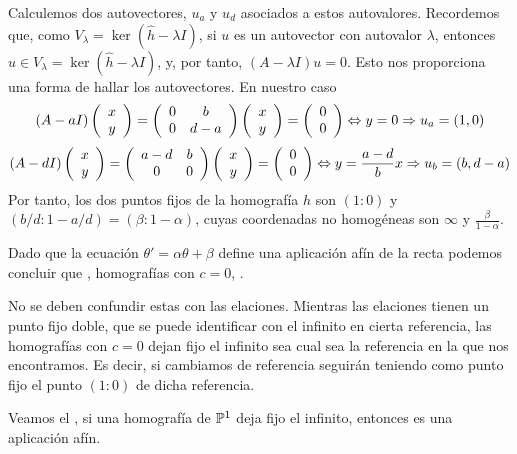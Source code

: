 Calculemos dos autovectores, $u_a$ y $u_d$ asociados a estos autovalores. Recordemos que, como $V_{\lambda}= \ker(\widehat{h}-\lambda I)$, si $u$ es un autovector con autovalor $\lambda$, entonces $u\in V_{\lambda}= \ker(\widehat{h}-\lambda I)$, y, por tanto, $(A-\lambda I)u=0$. Esto nos proporciona una forma de hallar los autovectores. En nuestro caso
\begin{equation*}
	(A-a I)\left( \begin{array}{c}
	x\\
	y
	\end{array}\right)=\left( \begin{array}{cc}
	0&b\\
	0&d-a
	\end{array}\right)
	\left( \begin{array}{c}
	x\\
	y
	\end{array}\right)=\left( \begin{array}{c}
	0\\
	0
	\end{array}\right)\Leftrightarrow y=0\Rightarrow u_{a}=(1,0)
\end{equation*}
\begin{equation*}
	(A-d I)\left( \begin{array}{c}
	x\\
	y
	\end{array}\right)=\left( \begin{array}{cc}
	a-d&b\\
	0&0
	\end{array}\right)
	\left( \begin{array}{c}
	x\\
	y
	\end{array}\right)=\left( \begin{array}{c}
	0\\
	0
\end{array}\right)\Leftrightarrow y=\frac{a-d}{b}x\Rightarrow u_b=(b,d-a)
\end{equation*}
Por tanto, los dos puntos fijos de la homografía $h$ son $(1:0)$ y $(b/d:1-a/d)=(\beta:1-\alpha)$, cuyas coordenadas no homogéneas son $\infty$ y $\frac{\beta}{1-\alpha}$. 

Dado que la ecuación $\theta'=\alpha\theta+\beta$ define una aplicación afín de la recta podemos concluir que , homografías con $c=0$, . 
\begin{obs}
	No se deben confundir estas con las elaciones. Mientras las elaciones tienen un punto fijo doble, que se puede identificar con el infinito en cierta referencia, las homografías con $c=0$ dejan fijo el infinito sea cual sea la referencia en la que nos encontramos. Es decir, si cambiamos de referencia seguirán teniendo como punto fijo el punto $(1:0)$ de dicha referencia.
\end{obs}
Veamos el , si una homografía de $\mathbb{P}^1$ deja fijo el infinito, entonces es una aplicación afín. 

